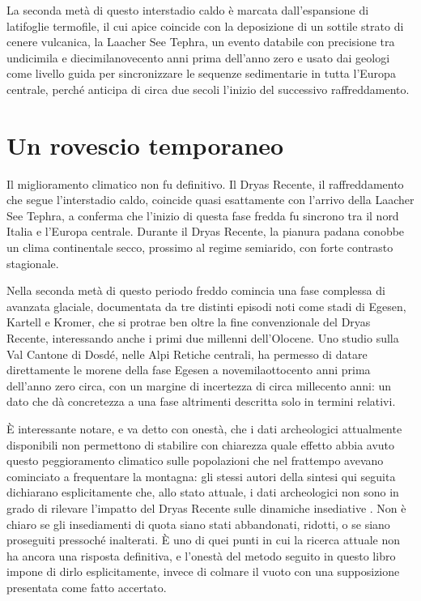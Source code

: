 La seconda metà di questo interstadio caldo è marcata dall'espansione di latifoglie termofile, il cui apice coincide con la deposizione di un sottile strato di cenere vulcanica, la Laacher See Tephra, un evento databile con precisione tra undicimila e diecimilanovecento anni prima dell'anno zero e usato dai geologi come livello guida per sincronizzare le sequenze sedimentarie in tutta l'Europa centrale, perché anticipa di circa due secoli l'inizio del successivo raffreddamento.

\section{Un rovescio temporaneo}

Il miglioramento climatico non fu definitivo. Il Dryas Recente, il raffreddamento che segue l'interstadio caldo, coincide quasi esattamente con l'arrivo della Laacher See Tephra, a conferma che l'inizio di questa fase fredda fu sincrono tra il nord Italia e l'Europa centrale. Durante il Dryas Recente, la pianura padana conobbe un clima continentale secco, prossimo al regime semiarido, con forte contrasto stagionale.

Nella seconda metà di questo periodo freddo comincia una fase complessa di avanzata glaciale, documentata da tre distinti episodi noti come stadi di Egesen, Kartell e Kromer, che si protrae ben oltre la fine convenzionale del Dryas Recente, interessando anche i primi due millenni dell'Olocene. Uno studio sulla Val Cantone di Dosdé, nelle Alpi Retiche centrali, ha permesso di datare direttamente le morene della fase Egesen a novemilaottocento anni prima dell'anno zero circa, con un margine di incertezza di circa millecento anni: un dato che dà concretezza a una fase altrimenti descritta solo in termini relativi.

È interessante notare, e va detto con onestà, che i dati archeologici attualmente disponibili non permettono di stabilire con chiarezza quale effetto abbia avuto questo peggioramento climatico sulle popolazioni che nel frattempo avevano cominciato a frequentare la montagna: gli stessi autori della sintesi qui seguita dichiarano esplicitamente che, allo stato attuale, i dati archeologici non sono in grado di rilevare l'impatto del Dryas Recente sulle dinamiche insediative \citep{ravazzi2007}. Non è chiaro se gli insediamenti di quota siano stati abbandonati, ridotti, o se siano proseguiti pressoché inalterati. È uno di quei punti in cui la ricerca attuale non ha ancora una risposta definitiva, e l'onestà del metodo seguito in questo libro impone di dirlo esplicitamente, invece di colmare il vuoto con una supposizione presentata come fatto accertato.

